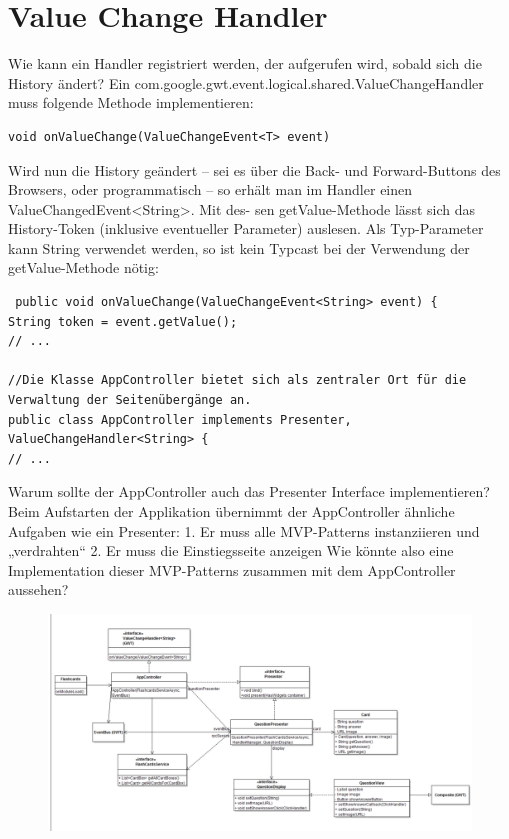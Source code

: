 \documentclass[a4paper,10pt]{scrreprt}
\begin{document}
\section{Value Change Handler}
Wie kann ein Handler registriert werden, der aufgerufen wird, sobald sich die History ändert? Ein
com.google.gwt.event.logical.shared.ValueChangeHandler muss folgende
Methode implementieren:
\begin{lstlisting}
void onValueChange(ValueChangeEvent<T> event)
\end{lstlisting}
Wird nun die History geändert – sei es über die Back- und Forward-Buttons des Browsers, oder
programmatisch – so erhält man im Handler einen ValueChangedEvent<String>. Mit des-
sen getValue-Methode lässt sich das History-Token (inklusive eventueller Parameter) auslesen.
Als Typ-Parameter kann String verwendet werden, so ist kein Typcast bei der Verwendung der
getValue-Methode nötig:
\begin{lstlisting}
 public void onValueChange(ValueChangeEvent<String> event) {
String token = event.getValue();
// ...

//Die Klasse AppController bietet sich als zentraler Ort für die Verwaltung der Seitenübergänge an.
public class AppController implements Presenter, ValueChangeHandler<String> {
// ...
\end{lstlisting}
Warum sollte der AppController auch das Presenter Interface implementieren? Beim Aufstarten der
Applikation übernimmt der AppController ähnliche Aufgaben wie ein Presenter:
1. Er muss alle MVP-Patterns instanziieren und „verdrahten“
2. Er muss die Einstiegsseite anzeigen
Wie könnte also eine Implementation dieser MVP-Patterns zusammen mit dem AppController aussehen?
\begin{figure}[h]
 \centering
 \includegraphics[angle=90,scale=0.5]{./apu1.png}
\end{figure}
\end{document}
